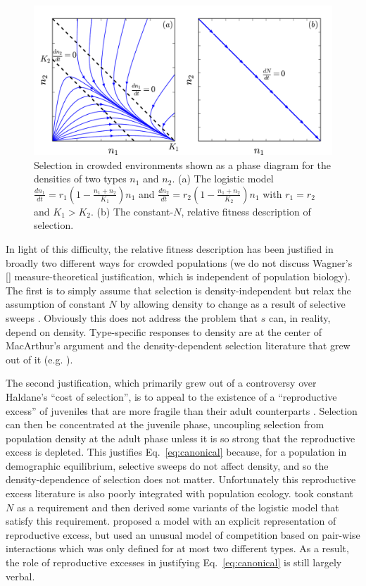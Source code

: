 \documentclass[12pt]{article}
\begin{document}
\begin{figure}
\centering
\includegraphics[scale=0.8]{Kplot.pdf}
\caption{\label{fig:Ksel} Selection in crowded environments shown as a phase diagram for the densities of two types $n_1$ and $n_2$. (a) The logistic model $\frac{dn_1}{dt}=r_1(1-\frac{n_1+n_2}{K_1})n_1$ and $\frac{dn_2}{dt}=r_2(1-\frac{n_1+n_2}{K_2})n_1$ with $r_1=r_2$ and $K_1>K_2$. (b) The constant-$N$, relative fitness description of selection.}
\end{figure}

In light of this difficulty, the relative fitness description has been justified in broadly two different ways for crowded populations (we do not discuss Wagner's [\citeyear{wagner_2010}] measure-theoretical justification, which is independent of population biology). The first is to simply assume that selection is density-independent but relax the assumption of constant $N$ by allowing density to change as a result of selective sweeps \citep[pp. 468]{barton_2007} \citep{prout_1980}. Obviously this does not address the problem that $s$ can, in reality, depend on density. Type-specific responses to density are at the center of MacArthur's argument and the density-dependent selection literature that grew out of it (e.g. \citep{roughgarden_1979}). 

The second justification, which primarily grew out of a controversy over Haldane's ``cost of selection'', is to appeal to the existence of a ``reproductive excess'' of juveniles that are more fragile than their adult counterparts \citep{turner1968population,kimura1969natural,nei1971fertility}. Selection can then be concentrated at the juvenile phase, uncoupling selection from population density at the adult phase unless it is so strong that the reproductive excess is depleted. This justifies Eq.~\eqref{eq:canonical} because, for a population in demographic equilibrium, selective sweeps do not affect density, and so the density-dependence of selection does not matter. Unfortunately this reproductive excess literature is also poorly integrated with population ecology. \cite{kimura1969natural} took constant $N$ as a requirement and then derived some variants of the logistic model that satisfy this requirement. \cite{nei1971fertility} proposed a model with an explicit representation of reproductive excess, but used an unusual model of competition based on pair-wise interactions which was only defined for at most two different types. As a result, the role of reproductive excesses in justifying Eq.~\eqref{eq:canonical} is still largely verbal.
\end{document}
